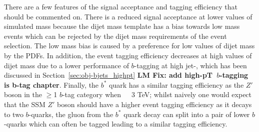 There are a few features of the signal acceptance and tagging efficiency that should be commented on.
There is a reduced signal acceptance at lower values of simulated mass
because the dijet mass template has a bias towards low mass events which
can be rejected by the dijet mass requirements of the event selection.
The low mass bias is caused by a preference for low values of dijet mass by the PDFs.
In addition, the event tagging efficiency decreases at high values of dijet mass
due to a lower performance of $b$-tagging at high jet-\pT,
which has been discussed in Section~\ref{sec:obj-bjets_highpt}
\textbf{LM Fix: add high-pT~$b$-tagging is b-tag chapter}.
Finally, the $b^*$ quark has a similar tagging efficiency
as the $Z'$ boson in the $\geq$1 $b$-tag category when~\mjj~\gt~3 TeV;
whilst naively one would expect that the SSM $Z'$ boson should have a higher
event tagging efficiency as it decays to two $b$-quarks,
the gluon from the $b^*$ quark decay can split into a pair of lower \pT{} $b$-quarks
which can often be tagged leading to a similar tagging efficiency.
